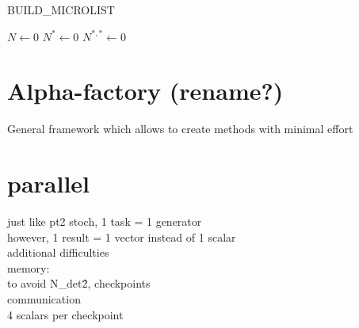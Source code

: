 \documentclass[./thesis.tex]{subfiles}
\begin{document}
\begin{algorithm}
	\label{BUILD_MICROLIST}
	\caption{BUILD\_MICROLIST}
		\KwData{ ------}
		\KwResult{ ------}
        $N \gets 0$ \;
        $N^* \gets 0$ \;   
        $N^{*,*} \gets 0$ \;    
\end{algorithm}


\section{Alpha-factory (rename?)}


General framework which allows to create methods with minimal effort 

\section{parallel}
just like pt2 stoch, 1 task = 1 generator \\
however, 1 result = 1 vector instead of 1 scalar \\
additional difficulties \\
memory: \\
to avoid N\_det\^2, checkpoints \\
communication \\
4 scalars per checkpoint \\
\end{document}

